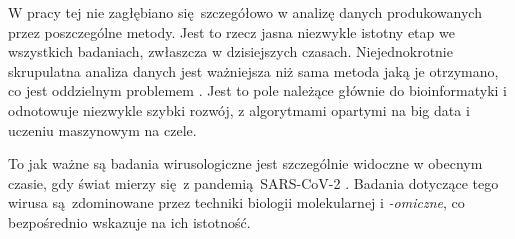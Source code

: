 \documentclass[two column, twoside, a4paper]{article}
\begin{document}
W pracy tej nie zagłębiano się szczegółowo w analizę danych produkowanych przez poszczególne metody. Jest to rzecz jasna niezwykle istotny etap we wszystkich badaniach, zwłaszcza w dzisiejszych czasach. Niejednokrotnie skrupulatna analiza danych jest ważniejsza niż sama metoda jaką je otrzymano, co jest oddzielnym problemem \autocite{Leung2003}. Jest to pole należące głównie do bioinformatyki i odnotowuje niezwykle szybki rozwój, z algorytmami opartymi na big data i uczeniu maszynowym na czele.

To jak ważne są badania wirusologiczne jest szczególnie widoczne w obecnym czasie, gdy świat mierzy się z pandemią SARS-CoV-2 \autocite{Tang2020}. Badania dotyczące tego wirusa są zdominowane przez techniki biologii molekularnej i \textit{-omiczne}, co bezpośrednio wskazuje na ich istotność.

\printbibliography
\end{document}
